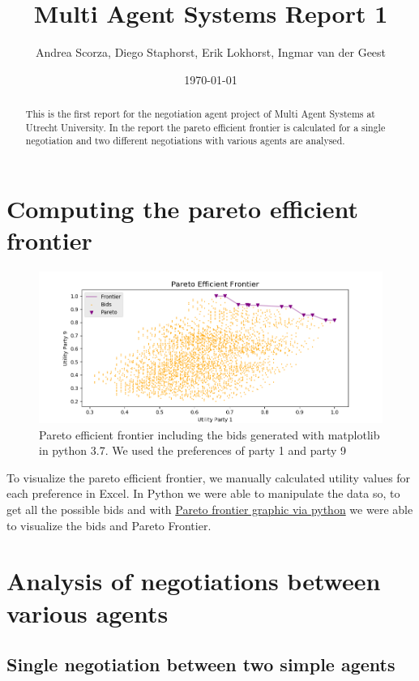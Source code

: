\documentclass[a4paper]{article}
\title{Multi Agent Systems Report 1}
\author{Andrea Scorza, Diego Staphorst, Erik Lokhorst, Ingmar van der Geest}
\date{\today}
\begin{document}
\maketitle

\begin{abstract}
This is the first report for the negotiation agent project of Multi Agent Systems at Utrecht University. In the report the pareto efficient frontier is calculated for a single negotiation and two different negotiations with various agents are analysed. 
\end{abstract}

\section{Computing the pareto efficient frontier}
\begin{figure}[h!]
\centering
\includegraphics[width=125mm]{pareto_efficient.png}
\caption{\label{fig:pareto_figure} Pareto efficient frontier including the bids generated with matplotlib in python 3.7. We used the preferences of party 1 and party 9}  
\end{figure}
To visualize the pareto efficient frontier, we manually calculated utility values for each preference in Excel. In Python we were able to manipulate the data so, to get all the possible bids and with \href{https://sirinnes.wordpress.com/2013/04/25/pareto-frontier-graphic-via-python/}{Pareto frontier graphic via python} we were able to visualize the bids and Pareto Frontier.
\newpage
\section{Analysis of negotiations between various agents}

\subsection{Single negotiation between two simple agents}
\end{document}
